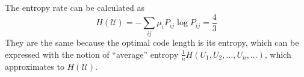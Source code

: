 \begin{exercise}
\begin{solution}
\begin{equation}
    \end{equation}
    The entropy rate can be calculated as
    \begin{equation}
      H(\mathcal{U})=-\sum_{i j} \mu_{i} P_{i j} \log P_{i j} = \frac{4}{3}
    \end{equation}
    They are the same because the optimal code length is its entropy, which can be expressed with the notion of ``average'' entropy $\frac{1}{n} H(U_1,U_2,\ldots,U_n,\ldots)$, which approximates to $H(\mathcal{U})$.
  \end{solution}
  \label{ex5-7}
\end{exercise}

